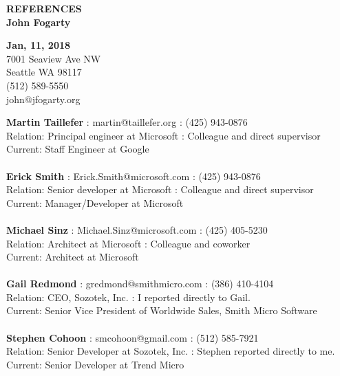 \documentclass[10pt,letterpaper]{article}
\begin{document}

\begin{center}
	{\Large \textbf{REFERENCES
			\\
			\vspace*{4mm}
			John Fogarty}}
\end{center}

\begin{flushright}
	\textbf{Jan, 11, 2018}\\
	7001 Seaview Ave NW\\
	Seattle WA 98117\\
	(512) 589-5550\\
	john@jfogarty.org\\	
\end{flushright}


\vspace{0.7in}
\setlength{\parindent}{0pt}

\textbf{Martin Taillefer} : martin@taillefer.org : (425) 943-0876\\
Relation: Principal engineer at Microsoft : Colleague and direct supervisor\\
Current: Staff Engineer at Google
\\
\\

\textbf{Erick Smith} : Erick.Smith@microsoft.com : (425) 943-0876\\
Relation: Senior developer at Microsoft : Colleague and direct supervisor\\
Current: Manager/Developer at Microsoft
\\
\\

\textbf{Michael Sinz} : Michael.Sinz@microsoft.com : (425) 405-5230\\
Relation: Architect at Microsoft : Colleague and coworker\\
Current: Architect at Microsoft
\\
\\


\textbf{Gail Redmond} : gredmond@smithmicro.com : (386) 410-4104\\
Relation: CEO, Sozotek, Inc. : I reported directly to Gail.\\
Current: Senior Vice President of Worldwide Sales, Smith Micro Software
\\
\\

\textbf{Stephen Cohoon} : smcohoon@gmail.com : (512) 585-7921\\
Relation: Senior Developer at Sozotek, Inc. : Stephen reported directly to me.\\
Current: Senior Developer at Trend Micro
\\
\end{document}
